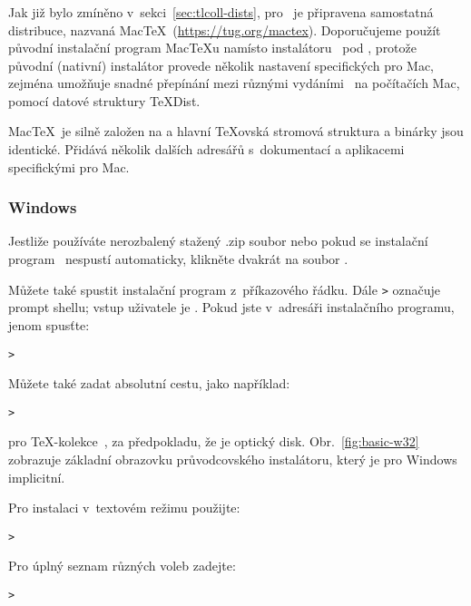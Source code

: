 \documentclass[\classoptions,slovak,english,czech]{\classname}
\newcommand\TKCS{\textsf{\TeX-kolekce}}
\begin{document}
\subsubsection{\macOS}
\label{sec:macosx}

Jak již bylo zmíněno v~sekci~\ref{sec:tlcoll-dists}, pro \macOS\ je 
připravena samostatná distribuce, nazvaná 
Mac\TeX\ (\url{https://tug.org/mactex}).
Doporučujeme použít původní instalační program 
Mac\TeX u namísto instalátoru \TL\
pod \macOS, protože původní (nativní) instalátor provede  
několik nastavení specifických pro Mac, zejména umožňuje 
snadné přepínání mezi různými vydáními \TL\ na počítačích Mac, pomocí %
datové struktury \TeX{}Dist. 

Mac\TeX\ je silně založen na \TL a hlavní \TeX ovská stromová 
struktura a binárky jsou identické. Přidává několik dalších adresářů 
s~dokumentací a aplikacemi specifickými pro Mac.

\subsubsection{Windows}\label{sec:wininst}

Jestliže používáte nerozbalený stažený .zip soubor nebo pokud se instalační 
program \DVD\ nespustí automaticky, klikněte 
dvakrát na soubor . 

Můžete také spustit instalační program z~příkazového řádku.
Dále \texttt{>} označuje prompt shellu; 
vstup uživatele je . 
Pokud jste v~adresáři instalačního programu, jenom spusťte:
\begin{alltt}
> 
\end{alltt}

Můžete také zadat absolutní cestu, jako například:
\begin{alltt}
> 
\end{alltt}
pro \TKCS\ \DVD, za předpokladu, že  je optický disk.
Obr.~\ref{fig:basic-w32} zobrazuje základní obrazovku průvodcovského 
instalátoru, který je pro Windows implicitní.

Pro instalaci v~textovém režimu použijte:
\begin{alltt}
> 
\end{alltt}

Pro úplný seznam různých voleb zadejte:
\begin{alltt}
> 
\end{alltt}
\end{document}
